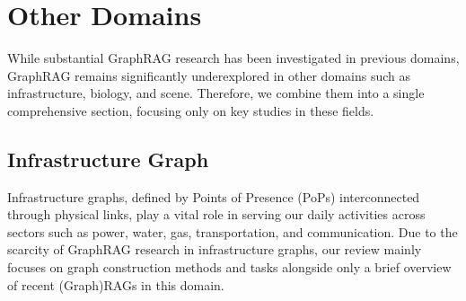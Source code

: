 \section{Other Domains}\label{sec-other}
While substantial GraphRAG research has been investigated in previous domains, GraphRAG remains significantly underexplored in other domains such as infrastructure, biology, and scene. Therefore, we combine them into a single comprehensive section, focusing only on key studies in these fields.



\subsection{Infrastructure Graph \texorpdfstring{\emojiinfratitle}{Infrastructure Graph}}
\label{sec-infra}


Infrastructure graphs, defined by Points of Presence (PoPs) interconnected through physical links, play a vital role in serving our daily activities across sectors such as power, water, gas, transportation, and communication. Due to the scarcity of GraphRAG research in infrastructure graphs, our review mainly focuses on graph construction methods and tasks alongside only a brief overview of recent (Graph)RAGs in this domain.

